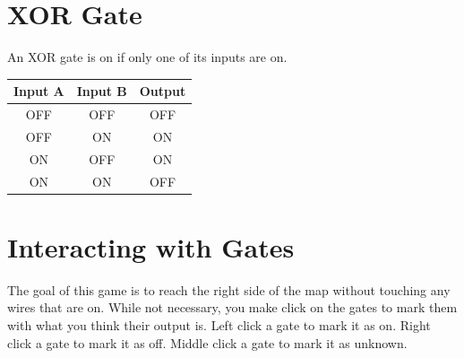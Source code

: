 \documentclass[12pt]{book}
\newcommand{\ON}{\textcolor{on}{ON}}
\newcommand{\OFF}{\textcolor{off}{OFF}}
\begin{document}
		\section{XOR Gate}
			An XOR gate is on if only one of its inputs are on.
			\begin{center}
				\begin{tabular}{|c|c|c|}
					\hline
					\textbf{Input A} & \textbf{Input B} & \textbf{Output}\\\hline
					\OFF & \OFF & \OFF\\\hline
					\OFF & \ON & \ON\\\hline
					\ON & \OFF & \ON\\\hline
					\ON & \ON & \OFF\\\hline
				\end{tabular}
			\end{center}
		\section{Interacting with Gates}
			The goal of this game is to reach the right side of the map without touching any wires that are on. While not necessary, you make click on the gates to mark them with what you think their output is. Left click a gate to mark it as on. Right click a gate to mark it as off. Middle click a gate to mark it as unknown.
\end{document}
